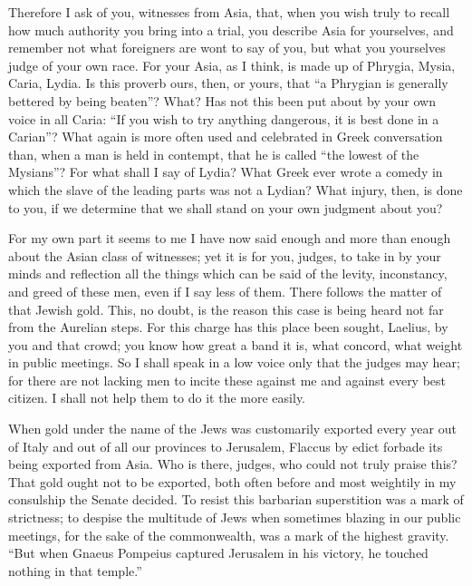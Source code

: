  Therefore I ask of you, witnesses from Asia, that, when you wish truly to recall how much authority you bring into a trial, you describe Asia for yourselves, and remember not what foreigners are wont to say of you, but what you yourselves judge of your own race. For your Asia, as I think, is made up of Phrygia, Mysia, Caria, Lydia. Is this proverb ours, then, or yours, that ``a Phrygian is generally bettered by being beaten''? What? Has not this been put about by your own voice in all Caria: ``If you wish to try anything dangerous, it is best done in a Carian''? What again is more often used and celebrated in Greek conversation than, when a man is held in contempt, that he is called ``the lowest of the Mysians''? For what shall I say of Lydia? What Greek ever wrote a comedy in which the slave of the leading parts was not a Lydian? What injury, then, is done to you, if we determine that we shall stand on your own judgment about you?

 For my own part it seems to me I have now said enough and more than enough about the Asian class of witnesses; yet it is for you, judges, to take in by your minds and reflection all the things which can be said of the levity, inconstancy, and greed of these men, even if I say less of them. There follows the matter of that Jewish gold. This, no doubt, is the reason this case is being heard not far from the Aurelian steps. For this charge has this place been sought, Laelius, by you and that crowd; you know how great a band it is, what concord, what weight in public meetings. So I shall speak in a low voice only that the judges may hear; for there are not lacking men to incite these against me and against every best citizen. I shall not help them to do it the more easily.

 When gold under the name of the Jews was customarily exported every year out of Italy and out of all our provinces to Jerusalem, Flaccus by edict forbade its being exported from Asia. Who is there, judges, who could not truly praise this? That gold ought not to be exported, both often before and most weightily in my consulship the Senate decided. To resist this barbarian superstition was a mark of strictness; to despise the multitude of Jews when sometimes blazing in our public meetings, for the sake of the commonwealth, was a mark of the highest gravity. ``But when Gnaeus Pompeius captured Jerusalem in his victory, he touched nothing in that temple.''

